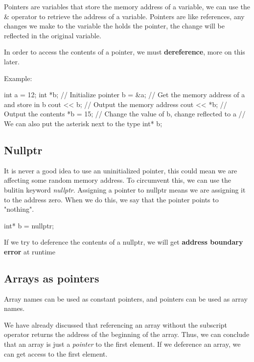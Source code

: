 \documentclass{report}
\begin{document}
    \pagebreak
    \bigbreak \noindent 
    \begin{concept}
 Pointers are variables that store the memory address of a variable, we can use the \& operator to retrieve the address of a variable. Pointers are like references, any changes we make to the variable the holds the pointer, the change will be reflected in the original variable.
	\end{concept}
    \bigbreak \noindent 
    \begin{notebox}
        In order to access the contents of a pointer, we must \textbf{dereference}, more on this later.
    \end{notebox}
    
    \bigbreak \noindent 
    Example:
    \bigbreak \noindent 
    
    \begin{cppcode}
int a = 12;
int *b; // Initialize pointer  
b = &a; // Get the memory address of a and store in b
cout << b; // Output the memory address
cout << *b; // Output the contents
*b = 15; // Change the value of b, change reflected to a
// We can also put the asterisk next to the type
int* b;
    \end{cppcode}
    

    \bigbreak \noindent 
    \subsection{Nullptr}
    \bigbreak \noindent 
    It is never a good idea to use an uninitialized pointer, this could mean we are affecting some random memory address. To circumvent this, we can use the bulitin keyword \textit{nullptr}. Assigning a pointer to nullptr means we are assigning it to the address zero. When we do this, we say that the pointer points to "nothing".
    \bigbreak \noindent 
    
    \begin{cppcode}
int* b = nullptr;
    \end{cppcode}
    
    \bigbreak \noindent 
    \begin{notebox}
        If we try to deference the contents of a nullptr, we will get \textbf{address boundary error} at runtime
    \end{notebox}
    
    \pagebreak
    \subsection{Arrays as pointers}
    \bigbreak \noindent 
    \begin{concept}
 Array names can be used as constant pointers, and pointers can be used as array names.
	\end{concept}
    \bigbreak \noindent 
    We have already discussed that referencing an array without the subscript operator returns the address of the beginning of the array. Thus, we can conclude that an array is just a \textit{pointer} to the first element.
    \bigbreak \noindent 
    If we deference an array, we can get access to the first element.
    \bigbreak \noindent 
    
\end{document}
